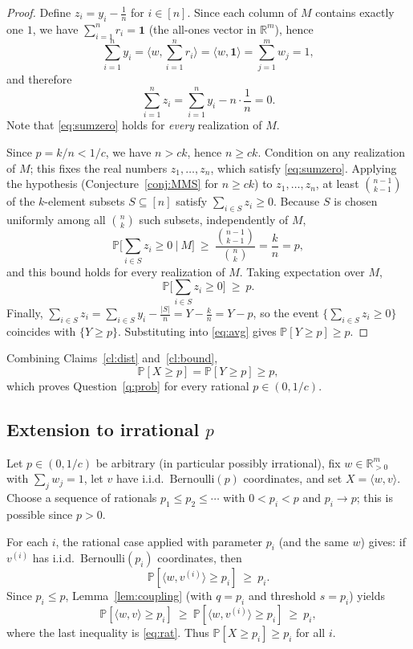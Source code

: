 \documentclass[11pt]{amsart}
\theoremstyle{plain}
\def\bR{\mathbb{R}}
\def\Pb{\mathbb{P}}
\begin{document}
\begin{proof}
Define $z_i=y_i-\frac1n$ for $i\in[n]$. Since each column of $M$ contains exactly
one $1$, we have $\sum_{i=1}^n r_i=\mathbf 1$ (the all-ones vector in
$\bR^m$), hence
\[
\sum_{i=1}^n y_i=\Big\langle w,\sum_{i=1}^n r_i\Big\rangle
=\langle w,\mathbf 1\rangle=\sum_{j=1}^m w_j=1,
\]
and therefore
\begin{equation}\label{eq:sumzero}
\sum_{i=1}^n z_i=\sum_{i=1}^n y_i-n\cdot\frac1n=0 .
\end{equation}
Note that \eqref{eq:sumzero} holds for \emph{every} realization of $M$.

Since $p=k/n<1/c$, we have $n>ck$, hence $n\ge ck$. Condition on any realization
of $M$; this fixes the real numbers $z_1,\dots,z_n$, which satisfy
\eqref{eq:sumzero}. Applying the hypothesis (Conjecture~\ref{conj:MMS} for
$n\ge ck$) to $z_1,\dots,z_n$, at least $\binom{n-1}{k-1}$ of the $k$-element
subsets $S\subseteq[n]$ satisfy $\sum_{i\in S}z_i\ge0$. Because $S$ is chosen
uniformly among all $\binom{n}{k}$ such subsets, independently of $M$,
\[
\Pb\Big[\textstyle\sum_{i\in S}z_i\ge0 \ \Big|\ M\Big]
\ \ge\ \frac{\binom{n-1}{k-1}}{\binom{n}{k}}
=\frac{k}{n}=p ,
\]
and this bound holds for every realization of $M$. Taking expectation over $M$,
\begin{equation}\label{eq:avg}
\Pb\Big[\textstyle\sum_{i\in S}z_i\ge0\Big]\ \ge\ p .
\end{equation}
Finally, $\sum_{i\in S}z_i=\sum_{i\in S}y_i-\frac{|S|}{n}=Y-\frac{k}{n}=Y-p$, so
the event $\{\sum_{i\in S}z_i\ge0\}$ coincides with $\{Y\ge p\}$. Substituting
into \eqref{eq:avg} gives $\Pb[Y\ge p]\ge p$.
\end{proof}

Combining Claims~\ref{cl:dist} and~\ref{cl:bound},
\[
\Pb[X\ge p]=\Pb[Y\ge p]\ge p ,
\]
which proves Question~\ref{q:prob} for every rational $p\in(0,1/c)$.

\subsection{Extension to irrational $p$}

Let $p\in(0,1/c)$ be arbitrary (in particular possibly irrational), fix
$w\in\bR_{>0}^m$ with $\sum_j w_j=1$, let $v$ have i.i.d.\
$\mathrm{Bernoulli}(p)$ coordinates, and set $X=\langle w,v\rangle$. Choose a
sequence of rationals $p_1\le p_2\le\cdots$ with $0<p_i<p$ and $p_i\to p$; this is
possible since $p>0$.

For each $i$, the rational case applied with parameter $p_i$ (and the same $w$)
gives: if $v^{(i)}$ has i.i.d.\ $\mathrm{Bernoulli}(p_i)$ coordinates, then
\begin{equation}\label{eq:rat}
\Pb[\langle w,v^{(i)}\rangle\ge p_i]\ \ge\ p_i .
\end{equation}
Since $p_i\le p$, Lemma~\ref{lem:coupling} (with $q=p_i$ and threshold $s=p_i$)
yields
\begin{equation}\label{eq:dom}
\Pb[\langle w,v\rangle\ge p_i]\ \ge\ \Pb[\langle w,v^{(i)}\rangle\ge p_i]\ \ge\ p_i ,
\end{equation}
where the last inequality is \eqref{eq:rat}. Thus $\Pb[X\ge p_i]\ge p_i$ for all
$i$.
\end{document}
